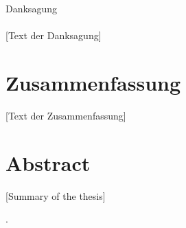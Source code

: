 \documentclass[oneside,bibliography=totocnumbered,BCOR=5mm]{scrbook}
\begin{document}
\thispagestyle{empty}
\vspace*{2.2cm}
\noindent
{\Huge Danksagung}\\
\vspace*{1.6cm} \\

[Text der Danksagung]

\newpage
\thispagestyle{empty}
\section*{Zusammenfassung}
[Text der Zusammenfassung]

\section*{Abstract}
[Summary of the thesis]


\clearpage

\tableofcontents
\listoffigures
\listoftables
\lstlistoflistings
.
\newpage





\end{document}
